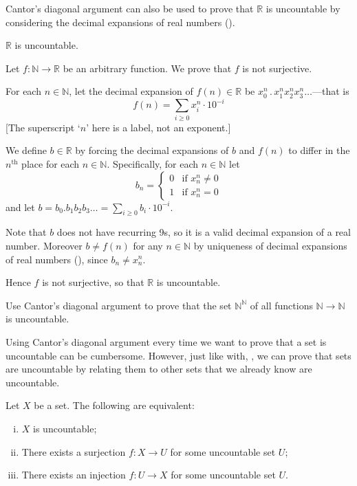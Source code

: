 Cantor's diagonal argument can also be used to prove that $\mathbb{R}$ is uncountable by considering the decimal expansions of real numbers ().

\begin{theorem}
\label{thmRIsUncountable}
$\mathbb{R}$ is uncountable.
\end{theorem}

\begin{cproof}
Let $f : \mathbb{N} \to \mathbb{R}$ be an arbitrary function. We prove that $f$ is not surjective.

For each $n \in \mathbb{N}$, let the decimal expansion of $f(n) \in \mathbb{R}$ be $x_0^n \,.\, x_1^n x_2^n x_3^n \dots$---that is
\[ f(n) = \sum_{i \ge 0} x_i^n \cdot 10^{-i} \]
[The superscript `$n$' here is a label, not an exponent.]

We define $b \in \mathbb{R}$ by forcing the decimal expansions of $b$ and $f(n)$ to differ in the $n^{\text{th}}$ place for each $n \in \mathbb{N}$. Specifically, for each $n \in \mathbb{N}$ let
\[ b_n = \begin{cases} 0 & \text{if } x_n^n \ne 0 \\ 1 & \text{if } x_n^n = 0 \end{cases} \]
and let $b = b_0. b_1 b_2 b_3 \dots{} = \sum_{i \ge 0} b_i \cdot 10^{-i}$.

Note that $b$ does not have recurring 9s, so it is a valid decimal expansion of a real number. Moreover $b \ne f(n)$ for any $n \in \mathbb{N}$ by uniqueness of decimal expansions of real numbers (), since $b_n \ne x_n^n$.

Hence $f$ is not surjective, so that $\mathbb{R}$ is uncountable.
\end{cproof}

\begin{exercise}
Use Cantor's diagonal argument to prove that the set $\mathbb{N}^{\mathbb{N}}$ of all functions $\mathbb{N} \to \mathbb{N}$ is uncountable.
\end{exercise}

Using Cantor's diagonal argument every time we want to prove that a set is uncountable can be cumbersome. However, just like with, , we can prove that sets are uncountable by relating them to other sets that we already know are uncountable.

\begin{theorem}
\label{thmUncountableFromInjSurj}
Let $X$ be a set. The following are equivalent:
\begin{enumerate}[(i)]
\item $X$ is uncountable;
\item \label{testitem} There exists a surjection $f : X \to U$ for some uncountable set $U$;
\item There exists an injection $f : U \to X$ for some uncountable set $U$.
\end{enumerate}
\end{theorem}

